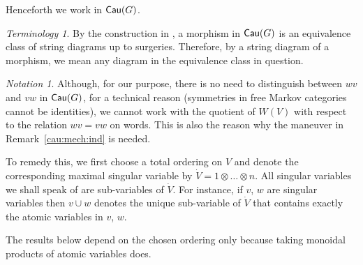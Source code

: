 \documentclass[12pt]{amsart}
\theoremstyle{plain}
\theoremstyle{definition}
\theoremstyle{remark}
\newtheorem{ter}[thm]{Terminology}
\newtheorem{nota}[thm]{Notation}
\numberwithin{equation}{section}
\theoremstyle{plain}
\newcommand{\0}{\emptyset}
\newcommand{\cat}[1]{\textup{\textsf{#1}}}
\DeclareMathOperator{\cau}{\sf{Cau}}
\begin{document}
Henceforth we work in $\cau(G)$.

\begin{ter}\label{what:dia}
By the construction in \cite{YinZhangModularity},  a morphism in  $\cau(G)$ is an equivalence class of string diagrams up to surgeries. Therefore, by a string diagram of a morphism, we mean any diagram in the equivalence class in question.
\end{ter}

\begin{nota}
Although, for our purpose, there is no need to distinguish between $wv$ and $vw$ in $\cat{Cau}(G)$, for a technical reason (symmetries in free Markov categories cannot be identities), we cannot work with the quotient of $W(V)$ with respect to the relation $wv=vw$ on words. This is also the reason why the maneuver in Remark~\ref{cau:mech:ind} is needed.

To remedy this, we first choose a total ordering on $V$ and denote the corresponding maximal singular variable by $\dot V = 1 \otimes \ldots \otimes n$. All singular variables we shall speak of are sub-variables of $\dot V$. For instance, if $v$, $w$ are  singular variables then  $v \cup w$  denotes the unique sub-variable of $\dot V$ that contains exactly the atomic variables in $v$, $w$.

The results below depend on the chosen ordering only because taking monoidal products of atomic variables does.
\end{nota}
\end{document}
